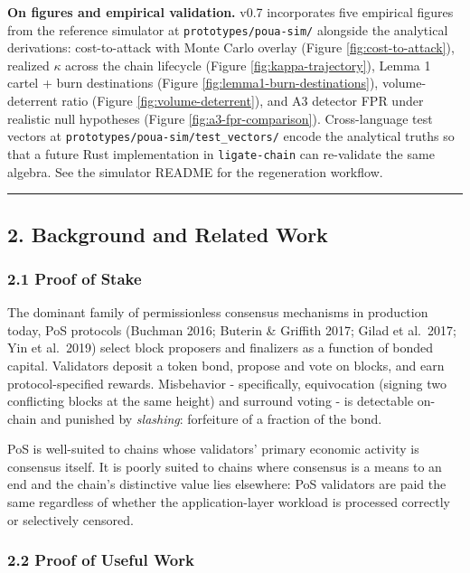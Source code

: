 \documentclass[
  11pt,
]{article}
\begin{document}
\textbf{On figures and empirical validation.} v0.7 incorporates five
empirical figures from the reference simulator at
\texttt{prototypes/poua-sim/} alongside the analytical derivations:
cost-to-attack with Monte Carlo overlay (Figure
\ref{fig:cost-to-attack}), realized \(\kappa\) across the chain
lifecycle (Figure \ref{fig:kappa-trajectory}), Lemma 1 cartel + burn
destinations (Figure \ref{fig:lemma1-burn-destinations}),
volume-deterrent ratio (Figure \ref{fig:volume-deterrent}), and A3
detector FPR under realistic null hypotheses (Figure
\ref{fig:a3-fpr-comparison}). Cross-language test vectors at
\texttt{prototypes/poua-sim/test\_vectors/} encode the analytical truths
so that a future Rust implementation in \texttt{ligate-chain} can
re-validate the same algebra. See the simulator README for the
regeneration workflow.

\begin{center}\rule{0.5\linewidth}{0.5pt}\end{center}

\subsection{2. Background and Related
Work}\label{background-and-related-work}

\subsubsection{2.1 Proof of Stake}\label{proof-of-stake}

The dominant family of permissionless consensus mechanisms in production
today, PoS protocols (Buchman 2016; Buterin \& Griffith 2017; Gilad et
al.~2017; Yin et al.~2019) select block proposers and finalizers as a
function of bonded capital. Validators deposit a token bond, propose and
vote on blocks, and earn protocol-specified rewards. Misbehavior -
specifically, equivocation (signing two conflicting blocks at the same
height) and surround voting - is detectable on-chain and punished by
\emph{slashing}: forfeiture of a fraction of the bond.

PoS is well-suited to chains whose validators' primary economic activity
is consensus itself. It is poorly suited to chains where consensus is a
means to an end and the chain's distinctive value lies elsewhere: PoS
validators are paid the same regardless of whether the application-layer
workload is processed correctly or selectively censored.

\subsubsection{2.2 Proof of Useful Work}\label{proof-of-useful-work}
\end{document}
